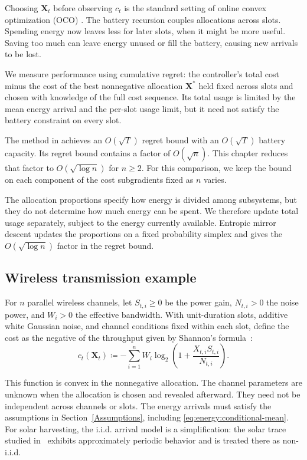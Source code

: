 Choosing $\mathbf{X}_t$ before observing $c_t$ is the standard setting of
online convex optimization (OCO)
\cite{cesa1996worst,zinkevich2003online,hazan2016introduction,shalev2011online,bubeck2011introduction}.
The battery recursion couples allocations across slots.
Spending energy now leaves less for later slots, when it might be more useful.
Saving too much can leave energy unused or fill the battery, causing new
arrivals to be lost.

We measure performance using cumulative regret: the controller's total cost
minus the cost of the best nonnegative allocation $\mathbf{X}^*$ held fixed
across slots and chosen with knowledge of the full cost sequence. Its total
usage is limited by the mean energy arrival and the per-slot usage limit,
but it need not satisfy the battery constraint on every slot.

The method in \cite{Yu2019} achieves an $O(\sqrt{T})$ regret bound with an
$O(\sqrt{T})$ battery capacity. Its regret bound contains a factor of
$O(\sqrt{n})$. This chapter reduces that factor to $O(\sqrt{\log n})$ for
$n\geq2$. For this comparison,
we keep the bound on each component of the cost subgradients fixed as
$n$ varies.

The allocation proportions specify how energy is divided among subsystems,
but they do not determine how much energy can be spent. We therefore update
total usage separately, subject to the energy currently available.
Entropic mirror descent updates the proportions on a fixed probability
simplex and gives the $O(\sqrt{\log n})$ factor in the regret bound.

\subsection{Wireless transmission example}\label{System example}

For $n$ parallel wireless channels, let $S_{t,i}\geq0$ be the power gain,
$N_{t,i}>0$ the noise power, and $W_i>0$ the effective bandwidth.
With unit-duration slots, additive white Gaussian noise, and channel
conditions fixed within each slot, define the cost as the negative of the
throughput given by Shannon's formula~\cite[Section~5.2.1, Eq.~(5.12)]{tse2005fundamentals}:
\[
    c_t(\mathbf{X}_t)
    \coloneqq-\sum_{i=1}^n W_i\log_2\left(
       1+\frac{X_{t,i}S_{t,i}}{N_{t,i}}\right).
\]

This function is convex in the nonnegative allocation. The channel
parameters are unknown when the allocation is chosen and revealed
afterward. They need not be independent across channels or slots.
The energy arrivals must satisfy the assumptions in
Section~\ref{Assumptions}, including \eqref{eq:energy:conditional-mean}.
For solar harvesting, the i.i.d. arrival model is a simplification:
the solar trace studied in~\cite[Section~6.2]{10.1145/3428337}
exhibits approximately periodic behavior and is treated there as non-i.i.d.


